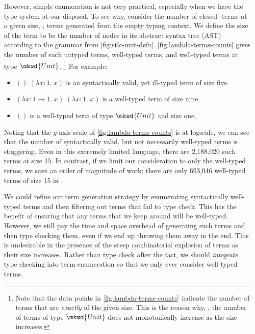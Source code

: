 

However, simple enumeration is not very practical, especially when we have the type system at our disposal.
To see why, consider the number of closed \stlcu-terms at a given size, \ie, terms generated from the empty typing context.
We define the size of the term to be the number of nodes in its abstract syntax tree (AST) according to the grammar from \autoref{fig:stlc-unit-defn}.
\autoref{fig:lambda-terms-counts} gives the number of such untyped terms, well-typed terms, and well-typed terms at type $\mkwd{Unit}$.
\footnote{%
  Note that the data points in \autoref{fig:lambda-terms-counts} indicate the number of terms that are \emph{exactly} of the given size.
  This is the reason why, \eg, the number of terms of type $\mkwd{Unit}$ does not monotonically increase as the size increases.
}
For example:
\begin{itemize}
  \item $()\;(λx{:}1.\;x)$ is an syntactically valid, yet ill-typed term of size five.
  \item $(λx{:}1 → 1.\;x)\;(λx{:}1.\;x)$ is a well-typed term of size nine.
  \item $()$ is a well-typed term of type $\mkwd{Unit}$ and size one.
\end{itemize}

Noting that the $y$-axis scale of \autoref{fig:lambda-terms-counts} is at logscale, we can see that the number of syntactically valid, but not necessarily well-typed terms is staggering.
Even in this extremely limited language, there are 2,188,020 such terms at size 15.
In contrast, if we limit our consideration to only the well-typed terms, we save an order of magnitude of work; there are only 693,046 well-typed terms of size 15 in \stlcu.~

We could refine our term generation strategy by enumerating syntactically well-typed terms and then filtering out terms that fail to type check.
This has the benefit of ensuring that any terms that we keep around will be well-typed.
However, we still pay the time and space overhead of generating such terms and then type checking them, even if we end up throwing them away in the end.
This is undesirable in the presence of the steep combinatorial explosion of terms as their size increases.
Rather than type check after the fact, we should \emph{integrate} type checking into term enumeration so that we only ever consider well typed terms.

